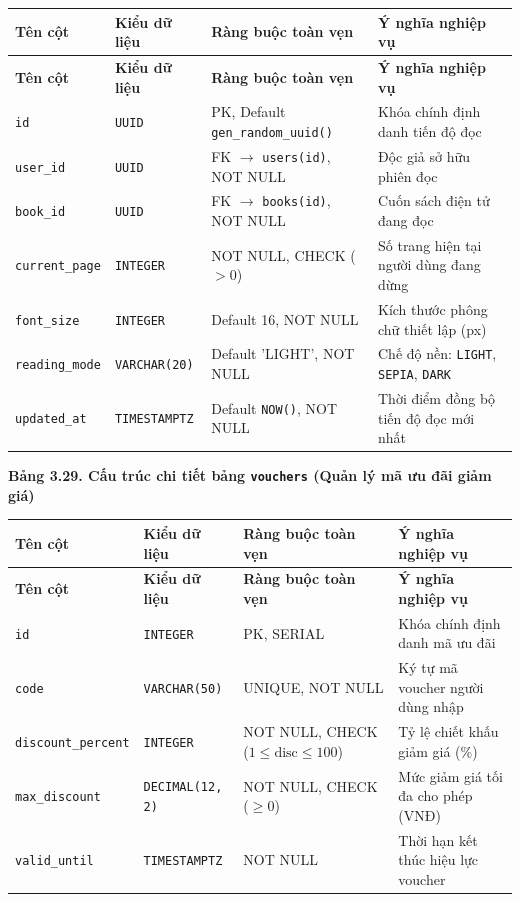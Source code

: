 \documentclass[11pt, a4paper]{report}
\begin{document}
\begin{longtable}{p{3.2cm} p{2.6cm} p{4.0cm} p{4.5cm}}
\toprule
\textbf{Tên cột} & \textbf{Kiểu dữ liệu} & \textbf{Ràng buộc toàn vẹn} & \textbf{Ý nghĩa nghiệp vụ} \\
\midrule
\endfirsthead
\toprule
\textbf{Tên cột} & \textbf{Kiểu dữ liệu} & \textbf{Ràng buộc toàn vẹn} & \textbf{Ý nghĩa nghiệp vụ} \\
\midrule
\endhead
\bottomrule
\endfoot
\texttt{id} & \texttt{UUID} & PK, Default \texttt{gen\_random\_uuid()} & Khóa chính định danh tiến độ đọc \\
\midrule
\texttt{user\_id} & \texttt{UUID} & FK $\rightarrow$ \texttt{users(id)}, NOT NULL & Độc giả sở hữu phiên đọc \\
\midrule
\texttt{book\_id} & \texttt{UUID} & FK $\rightarrow$ \texttt{books(id)}, NOT NULL & Cuốn sách điện tử đang đọc \\
\midrule
\texttt{current\_page} & \texttt{INTEGER} & NOT NULL, CHECK ($> 0$) & Số trang hiện tại người dùng đang dừng \\
\midrule
\texttt{font\_size} & \texttt{INTEGER} & Default 16, NOT NULL & Kích thước phông chữ thiết lập (px) \\
\midrule
\texttt{reading\_mode} & \texttt{VARCHAR(20)} & Default 'LIGHT', NOT NULL & Chế độ nền: \texttt{LIGHT}, \texttt{SEPIA}, \texttt{DARK} \\
\midrule
\texttt{updated\_at} & \texttt{TIMESTAMPTZ} & Default \texttt{NOW()}, NOT NULL & Thời điểm đồng bộ tiến độ đọc mới nhất \\
\bottomrule
\end{longtable}

\vspace{0.3cm}
\noindent\textbf{Bảng 3.29. Cấu trúc chi tiết bảng \texttt{vouchers} (Quản lý mã ưu đãi giảm giá)}
\nopagebreak

\begin{longtable}{p{3.2cm} p{2.6cm} p{4.0cm} p{4.5cm}}
\toprule
\textbf{Tên cột} & \textbf{Kiểu dữ liệu} & \textbf{Ràng buộc toàn vẹn} & \textbf{Ý nghĩa nghiệp vụ} \\
\midrule
\endfirsthead
\toprule
\textbf{Tên cột} & \textbf{Kiểu dữ liệu} & \textbf{Ràng buộc toàn vẹn} & \textbf{Ý nghĩa nghiệp vụ} \\
\midrule
\endhead
\bottomrule
\endfoot
\texttt{id} & \texttt{INTEGER} & PK, SERIAL & Khóa chính định danh mã ưu đãi \\
\midrule
\texttt{code} & \texttt{VARCHAR(50)} & UNIQUE, NOT NULL & Ký tự mã voucher người dùng nhập \\
\midrule
\texttt{discount\_percent}& \texttt{INTEGER} & NOT NULL, CHECK ($1 \le \text{disc} \le 100$) & Tỷ lệ chiết khấu giảm giá (\%) \\
\midrule
\texttt{max\_discount} & \texttt{DECIMAL(12, 2)} & NOT NULL, CHECK ($\ge 0$) & Mức giảm giá tối đa cho phép (VNĐ) \\
\midrule
\texttt{valid\_until} & \texttt{TIMESTAMPTZ} & NOT NULL & Thời hạn kết thúc hiệu lực voucher \\
\bottomrule
\end{longtable}
\end{document}
